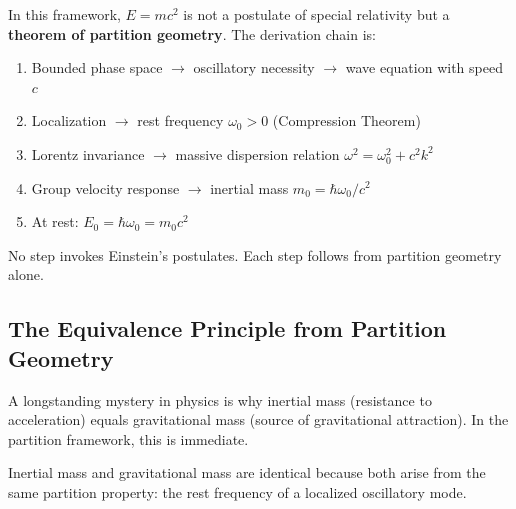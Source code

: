 \begin{remark}[The status of $E = mc^2$]
In this framework, $E = mc^2$ is not a postulate of special relativity but a \textbf{theorem of partition geometry}. The derivation chain is:
\begin{enumerate}
    \item Bounded phase space $\to$ oscillatory necessity $\to$ wave equation with speed $c$
    \item Localization $\to$ rest frequency $\omega_0 > 0$ (Compression Theorem)
    \item Lorentz invariance $\to$ massive dispersion relation $\omega^2 = \omega_0^2 + c^2k^2$
    \item Group velocity response $\to$ inertial mass $m_0 = \hbar\omega_0/c^2$
    \item At rest: $E_0 = \hbar\omega_0 = m_0 c^2$
\end{enumerate}

No step invokes Einstein's postulates. Each step follows from partition geometry alone.
\end{remark}

\subsection{The Equivalence Principle from Partition Geometry}

A longstanding mystery in physics is why inertial mass (resistance to acceleration) equals gravitational mass (source of gravitational attraction). In the partition framework, this is immediate.

\begin{theorem}
\label{thm:equivalence-principle}
Inertial mass and gravitational mass are identical because both arise from the same partition property: the rest frequency of a localized oscillatory mode.
\end{theorem}

